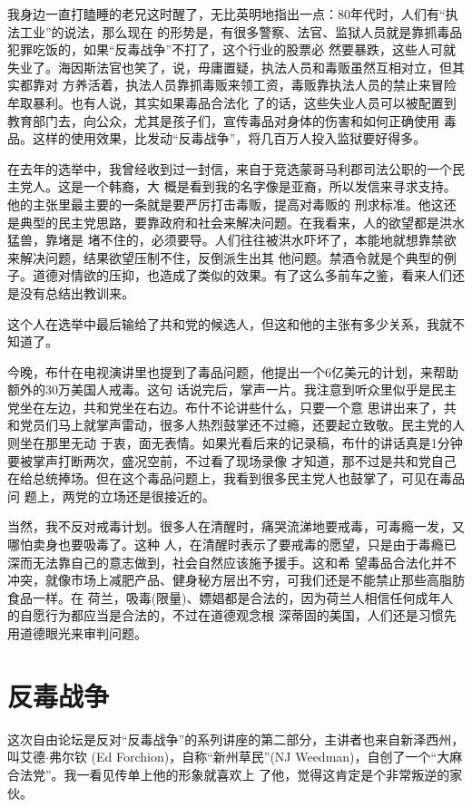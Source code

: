 ﻿\documentclass[11pt]{article}
\begin{document}
我身边一直打瞌睡的老兄这时醒了，无比英明地指出一点：80年代时，人们有``执法工业''的说法，那么现在
的形势是，有很多警察、法官、监狱人员就是靠抓毒品犯罪吃饭的，如果``反毒战争''不打了，这个行业的股票必
然要暴跌，这些人可就失业了。海因斯法官也笑了，说，毋庸置疑，执法人员和毒贩虽然互相对立，但其实都靠对
方养活着，执法人员靠抓毒贩来领工资，毒贩靠执法人员的禁止来冒险牟取暴利。也有人说，其实如果毒品合法化
了的话，这些失业人员可以被配置到教育部门去，向公众，尤其是孩子们，宣传毒品对身体的伤害和如何正确使用
毒品。这样的使用效果，比发动``反毒战争''，将几百万人投入监狱要好得多。

在去年的选举中，我曾经收到过一封信，来自于竞选蒙哥马利郡司法公职的一个民主党人。这是一个韩裔，大
概是看到我的名字像是亚裔，所以发信来寻求支持。他的主张里最主要的一条就是要严厉打击毒贩，提高对毒贩的
刑求标准。他这还是典型的民主党思路，要靠政府和社会来解决问题。在我看来，人的欲望都是洪水猛兽，靠堵是
堵不住的，必须要导。人们往往被洪水吓坏了，本能地就想靠禁欲来解决问题，结果欲望压制不住，反倒派生出其
他问题。禁酒令就是个典型的例子。道德对情欲的压抑，也造成了类似的效果。有了这么多前车之鉴，看来人们还
是没有总结出教训来。

这个人在选举中最后输给了共和党的候选人，但这和他的主张有多少关系，我就不知道了。

今晚，布什在电视演讲里也提到了毒品问题，他提出一个6亿美元的计划，来帮助额外的30万美国人戒毒。这句
话说完后，掌声一片。我注意到听众里似乎是民主党坐在左边，共和党坐在右边。布什不论讲些什么，只要一个意
思讲出来了，共和党员们马上就掌声雷动，很多人热烈鼓掌还不过瘾，还要起立致敬。民主党的人则坐在那里无动
于衷，面无表情。如果光看后来的记录稿，布什的讲话真是1分钟要被掌声打断两次，盛况空前，不过看了现场录像
才知道，那不过是共和党自己在给总统捧场。但在这个毒品问题上，我看到很多民主党人也鼓掌了，可见在毒品问
题上，两党的立场还是很接近的。

当然，我不反对戒毒计划。很多人在清醒时，痛哭流涕地要戒毒，可毒瘾一发，又哪怕卖身也要吸毒了。这种
人，在清醒时表示了要戒毒的愿望，只是由于毒瘾已深而无法靠自己的意志做到，社会自然应该施予援手。这和希
望毒品合法化并不冲突，就像市场上减肥产品、健身秘方层出不穷，可我们还是不能禁止那些高脂肪食品一样。在
荷兰，吸毒(限量)、嫖娼都是合法的，因为荷兰人相信任何成年人的自愿行为都应当是合法的，不过在道德观念根
深蒂固的美国，人们还是习惯先用道德眼光来审判问题。

\section{反毒战争}

这次自由论坛是反对``反毒战争''的系列讲座的第二部分，主讲者也来自新泽西州，叫艾德$\cdot$弗尔钦
(Ed Forchion)，自称``新州草民''(NJ Weedman)，自创了一个``大麻合法党''。我一看见传单上他的形象就喜欢上
了他，觉得这肯定是个非常叛逆的家伙。
\end{document}
